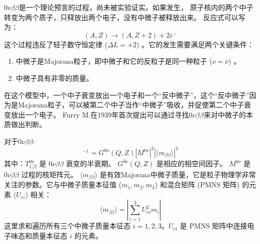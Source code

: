 $0\nu\beta\beta$是一个理论预言的过程，尚未被实验证实。如果发生，
    原子核内的两个中子转变为两个质子，只释放出两个电子，没有中微子被释放出来。
    反应式可以写为：
    \begin{equation}
         (A, Z)  \rightarrow  (A, Z+2)  + 2e^{-}
    \end{equation}
    这个过程违反了轻子数守恒定律  ($\Delta L = +2$) 。它的发生需要满足两个关键条件：
    \begin{enumerate}
        \item 中微子是Majorana粒子，即中微子和它的反粒子是同一种粒子  ($\nu = \bar{\nu}$) 。
        \item 中微子具有非零的质量。
    \end{enumerate}
    在这个模型中，一个中子衰变放出一个电子和一个“反中微子”，这个“反中微子”因为是Majorana粒子，可以被第二个中子当作“中微子”吸收，并促使第二个中子衰变放出一个电子。
    Furry M.在1939年首次提出可以通过寻找$0\nu\beta\beta$来对中微子的本质做出判断。\cite{PhysRev.56.1184}

    对于$0\nu\beta\beta$:
    \begin{equation}
        [ T^{0\nu}_{1/2} ]^{-1} = G^{0\nu} (Q, Z)  | M^{0\nu} |^2 | \langle m_{\beta\beta} \rangle |^2
        \label{eq:0nubb_halflife}
    \end{equation}
    其中：$T^{0\nu}_{1/2}$ 是 $0\nu\beta\beta$ 衰变的半衰期。
$G^{0\nu} (Q, Z) $ 是相应的相空间因子。
$M^{0\nu}$ 是 $0\nu\beta\beta$ 过程的核矩阵元。
$\langle m_{\beta\beta} \rangle$ 是有效Majorana中微子质量，它是粒子物理学非常关注的参数。它与中微子质量本征值  ($m_1, m_2, m_3$)  和混合矩阵 (PMNS 矩阵) 的元素  ($U_{ei}$)  相关：
        \begin{equation}
            \langle m_{\beta\beta} \rangle = \left| \sum_{i=1}^{3} U^2_{ei} m_i \right|
            \label{eq:mbb}
        \end{equation}
        这里求和遍历所有三个中微子质量本征态 $i=1, 2, 3$。$U_{ei}$ 是 PMNS 矩阵中连接电子味态和质量本征态 $i$ 的元素。




